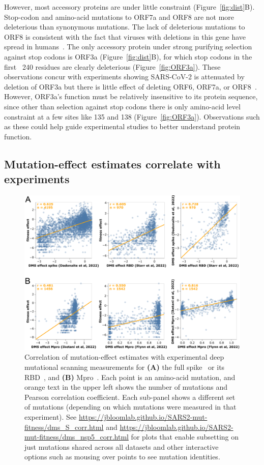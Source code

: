 \documentclass[9pt,twocolumn,twoside]{gsajnl_modified}
\begin{document}
However, most accessory proteins are under little constraint (Figure~\ref{fig:dist}B).
Stop-codon and amino-acid mutations to ORF7a and ORF8 are not more deleterious than synonymous mutations.
The lack of deleterious mutations to ORF8 is consistent with the fact that viruses with deletions in this gene have spread in humans~\citep{su2020discovery}.
The only accessory protein under strong purifying selection against stop codons is ORF3a (Figure~\ref{fig:dist}B), for which stop codons in the first ~240 residues are clearly deleterious (Figure~\ref{fig:ORF3a}).
These observations concur with experiments showing SARS-CoV-2 is attenuated by deletion of ORF3a but there is little effect of deleting ORF6, ORF7a, or ORF8~\citep{mcgrath2022sars,silvas2021contribution,liu2022live}.
However, ORF3a's function must be relatively insensitive to its protein sequence, since other than selection against stop codons there is only amino-acid level constraint at a few sites like 135 and 138 (Figure~\ref{fig:ORF3a}).
Observations such as these could help guide experimental studies to better understand protein function.

\subsection*{Mutation-effect estimates correlate with experiments}

\begin{figure}
\centering
\includegraphics[width=0.7\linewidth]{figs/dms.png}
\caption{
Correlation of mutation-effect estimates with experimental deep mutational scanning measurements for {\bf (A)} the full spike~\citep{dadonaite2022pseudovirus} or its RBD~\citep{starr2022deep}, and {\bf (B)} Mpro~\citep{flynn2022,iketani2022functional}.
Each point is an amino-acid mutation, and orange text in the upper left shows the number of mutations and Pearson correlation coefficient.
Each sub-panel shows a different set of mutations (depending on which mutations were measured in that experiment).
See \url{https://jbloomlab.github.io/SARS2-mut-fitness/dms_S_corr.html} and \url{https://jbloomlab.github.io/SARS2-mut-fitness/dms_nsp5_corr.html} for plots that enable subsetting on just mutations shared across all datasets and other interactive options such as mousing over points to see mutation identities.
\label{fig:dms}
}
\end{figure}
\end{document}
